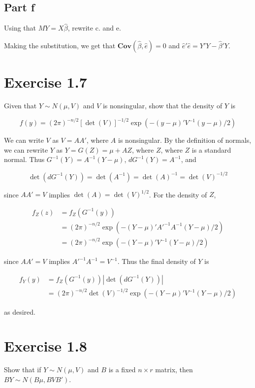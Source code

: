 \documentclass{article}
\newcommand{\cov}{\boldsymbol{Cov}}
\begin{document}
\subsection*{Part f}

Using that $MY=X\hat{\beta}$, rewrite c. and e.

Making the substitution, we get that $\cov(\hat{\beta}, \hat{e}) = 0$ and $\hat{e}'\hat{e} = Y'Y - \hat{\beta}'Y$.

\section*{Exercise 1.7}

Given that $Y \sim N(\mu, V)$ and $V$ is nonsingular, show that the density of $Y$ is

\[
f(y) = (2\pi)^{-n/2}[\det(V)]^{-1/2}\exp(-(y-\mu)'V^{-1}(y-\mu)/2)
\]

We can write $V$ as $V = AA'$, where $A$ is nonsingular. By the definition of normals, we can rewrite $Y$ as $Y = G(Z)= \mu + AZ$, where $Z$, where $Z$ is a standard normal. Thus $G^{-1}(Y) = A^{-1}(Y-\mu)$,  $dG^{-1}(Y) = A^{-1}$, and

\[
\det(dG^{-1}(Y)) = \det(A^{-1}) = \det(A)^{-1} = \det(V)^{-1/2}
\]

since $AA' = V$ implies $\det(A) = \det(V)^{1/2}$. For the density of $Z$,

\begin{align*}
f_Z(z) &= f_Z(G^{-1}(y)) \\
&= (2\pi)^{-n/2}\exp(
-(Y-\mu)'A'^{-1}A^{-1}(Y-\mu)/2
) \\
&= (2\pi)^{-n/2}\exp(
-(Y-\mu)'V^{-1}(Y-\mu)/2
)
\end{align*}

since $AA'=V$ implies $A'^{-1}A^{-1}=V^{-1}$. Thus the final density of $Y$ is

\begin{align*}
f_Y(y) &= f_Z(G^{-1}(y))|\det(dG^{-1}(Y))| \\
&= (2\pi)^{-n/2}\det(V)^{-1/2}\exp(
-(Y-\mu)'V^{-1}(Y-\mu)/2
)
\end{align*}

as desired.

\section*{Exercise 1.8}

Show that if $Y\sim N(\mu, V)$ and $B$ is a fixed $n \times r$ matrix, then $BY \sim N(B\mu, BVB')$.
\end{document}
